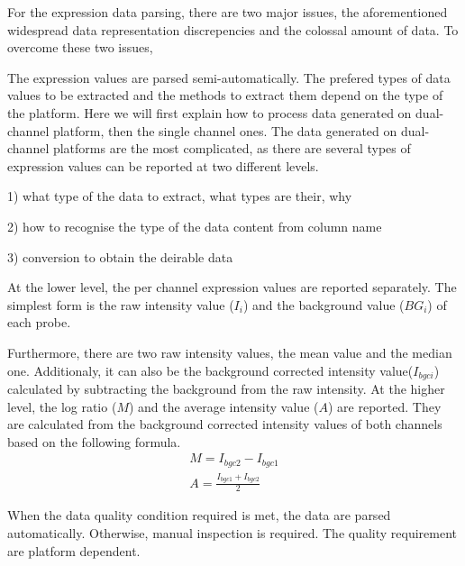 For the expression data parsing, there are two major issues, the aforementioned
widespread data representation discrepencies and the colossal amount of data.
%
To overcome these two issues, 

The expression values are parsed semi-automatically.  The prefered types of
data values to be extracted and the methods to extract them depend on the type
of the platform.  Here we will first explain how to process data generated on
dual-channel platform, then the single channel ones.
%
%
The data generated on dual-channel platforms are the most complicated,
as there are several types of expression values can be reported at two
different levels.
%



1) what type of the data to extract, what types are their, why

2) how to recognise the type of the data content from column name

3) conversion to obtain the deirable data




At the lower level, the per channel expression values are reported separately.
%
The simplest form is the raw intensity value ($I_i$) and the background value
($BG_i$) of each probe.

Furthermore, there are two raw intensity values, the mean value and the median
one.
%
Additionaly, it can also be the background corrected intensity
value($I_{bgci}$) calculated by subtracting the background from the raw
intensity.
%
At the higher level, the log ratio ($M$) and the average intensity value ($A$)
are reported.  They are calculated from the background corrected intensity
values of both channels based on the following formula.
%
\begin{eqnarray}
M = I_{bgc2} - I_{bgc1} \\
A = \frac{I_{bgc1} + I_{bgc2}}{2}
\end{eqnarray}
%




When the data quality condition required is met, the data are parsed
automatically. Otherwise, manual inspection is required.
%
The quality requirement are platform dependent.  
% 




